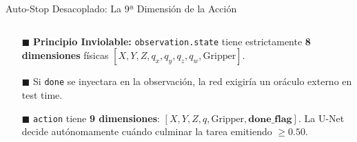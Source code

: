 \begin{frame}{Auto-Stop Desacoplado: La 9ª Dimensión de la Acción}
  \vspace{0.8mm}
  \begin{columns}[T, onlytextwidth]
    \begin{column}{0.485\textwidth}
      \begin{tcolorbox}[
        enhanced,
        colback=WhiteBg,
        colframe=PurpleAction,
        arc=\CardArc,
        boxrule=\CardRule,
        height=\CardHeightDouble,
        title={\CardTitleFont Prevención de Causal Leakage},
        colbacktitle=PurpleAction,
        coltitle=WhiteBg,
        top=1.2mm, bottom=1.2mm, left=1.8mm, right=1.8mm
      ]
        {\BodyFont
        \begin{itemize}\setlength{\itemsep}{1.2pt}
          \item[\textcolor{AlertRed}{$\blacksquare$}] \textbf{Principio Inviolable:} \texttt{observation.state} tiene estrictamente \textbf{8 dimensiones} físicas $[X, Y, Z, q_x, q_y, q_z, q_w, \text{Gripper}]$.
          \item[\textcolor{AlertRed}{$\blacksquare$}] Si \texttt{done} se inyectara en la observación, la red exigiría un oráculo externo en test time.
          \item[\textcolor{PurpleAction}{$\blacksquare$}] \texttt{action} tiene \textbf{9 dimensiones}: $[X, Y, Z, q, \text{Gripper}, \mathbf{done\_flag}]$. La U-Net decide autónomamente cuándo culminar la tarea emitiendo $\ge 0.50$.
        \end{itemize}}
      \end{tcolorbox}
    \end{column}


\end{columns}
\end{frame}
